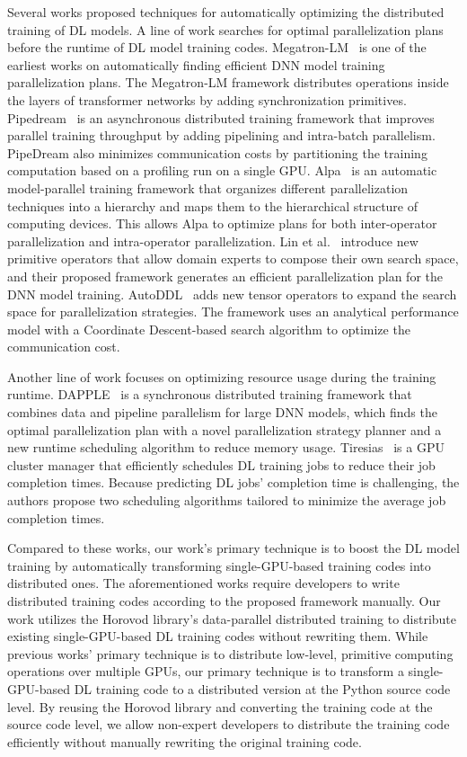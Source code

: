 Several works proposed techniques for automatically optimizing the
distributed training of DL models.
A line of work searches for optimal parallelization plans before the runtime of
DL model training codes.
Megatron-LM~\cite{megatron-lm} is one of the earliest works on automatically
finding efficient DNN model training parallelization plans.
The Megatron-LM framework distributes operations inside the layers of 
transformer networks by adding synchronization primitives.
Pipedream~\cite{pipedream} is an asynchronous distributed training framework 
that improves parallel training throughput by adding pipelining and intra-batch parallelism. 
PipeDream also minimizes communication costs by partitioning the training computation based on a profiling run on a single GPU.
Alpa~\cite{alpa} is an automatic model-parallel training framework that 
organizes different parallelization techniques into a hierarchy 
and maps them to the hierarchical structure of computing devices. 
This allows Alpa to optimize plans for both inter-operator parallelization and intra-operator parallelization.
Lin et al.~\cite{nnscaler} introduce new primitive operators that allow domain
experts to compose their own search space, and their proposed framework
generates an efficient parallelization plan for the DNN model training.
AutoDDL~\cite{autoddl} adds new tensor operators to expand the search space for
parallelization strategies. 
The framework uses an analytical performance model with a Coordinate
Descent-based search algorithm to optimize the communication cost.

Another line of work focuses on optimizing resource usage
during the training runtime. 
DAPPLE~\cite{dapple} is a synchronous distributed training framework that
combines data and pipeline parallelism for large DNN models, which finds the
optimal parallelization plan with a novel parallelization strategy planner and
a new runtime scheduling algorithm to reduce memory usage.
Tiresias~\cite{tiresias} is a GPU cluster manager that efficiently schedules DL
training jobs to reduce their job completion times. 
Because predicting DL jobs' completion time is challenging,
the authors propose two scheduling algorithms tailored to minimize the average
job completion times.

Compared to these works, our work's primary technique is to boost the DL model
training by automatically transforming single-GPU-based training codes into
distributed ones.
The aforementioned works require developers to write distributed training codes
according to the proposed framework manually.
Our work utilizes the Horovod library’s data-parallel distributed training to 
distribute existing single-GPU-based DL training codes without rewriting them.
While previous works’ primary technique is to distribute low-level, 
primitive computing operations over multiple GPUs, 
our primary technique is to transform a single-GPU-based DL training code 
to a distributed version at the Python source code level. 
By reusing the Horovod library and converting the training code at the source
code level, we allow non-expert developers to distribute the training
code efficiently without manually rewriting the original training code.



